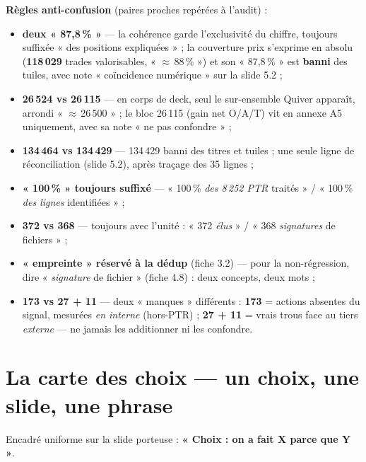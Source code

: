 \documentclass[11pt,a4paper]{article}
\begin{document}
\noindent\textbf{Règles anti-confusion} (paires proches repérées à l'audit) :
\begin{itemize}[itemsep=1pt, topsep=2pt]
  \item \textbf{deux « 87,8\,\% »} --- la cohérence garde l'exclusivité du chiffre, toujours
        suffixée « des positions expliquées » ; la couverture prix s'exprime en absolu
        (\textbf{118\,029} trades valorisables, « $\approx$\,88\,\% ») et son « 87,8\,\% »
        est \textbf{banni} des tuiles, avec note « coïncidence numérique » sur la slide 5.2 ;
  \item \textbf{26\,524 vs 26\,115} --- en corps de deck, seul le sur-ensemble Quiver
        apparaît, arrondi « $\approx$\,26\,500 » ; le bloc 26\,115 (gain net O/A/T) vit en
        annexe A5 uniquement, avec sa note « ne pas confondre » ;
  \item \textbf{134\,464 vs 134\,429} --- 134\,429 banni des titres et tuiles ; une seule
        ligne de réconciliation (slide 5.2), après traçage des 35 lignes ;
  \item \textbf{« 100\,\% » toujours suffixé} --- « 100\,\% \emph{des 8\,252 PTR} traités » /
        « 100\,\% \emph{des lignes} identifiées » ;
  \item \textbf{372 vs 368} --- toujours avec l'unité : « 372 \emph{élus} » /
        « 368 \emph{signatures} de fichiers » ;
  \item \textbf{« empreinte » réservé à la dédup} (fiche 3.2) --- pour la non-régression,
        dire « \emph{signature} de fichier » (fiche 4.8) : deux concepts, deux mots ;
  \item \textbf{173 vs 27 + 11} --- deux « manques » différents : \textbf{173} = actions
        absentes du signal, mesurées \emph{en interne} (hors-PTR) ; \textbf{27 + 11} =
        vrais trous face au tiers \emph{externe} --- ne jamais les additionner ni les
        confondre.
\end{itemize}

\section{La carte des choix --- un choix, une slide, une phrase}
\label{sec:choix}

Encadré uniforme sur la slide porteuse : \textbf{« Choix : on a fait X parce que Y »}.
\end{document}
